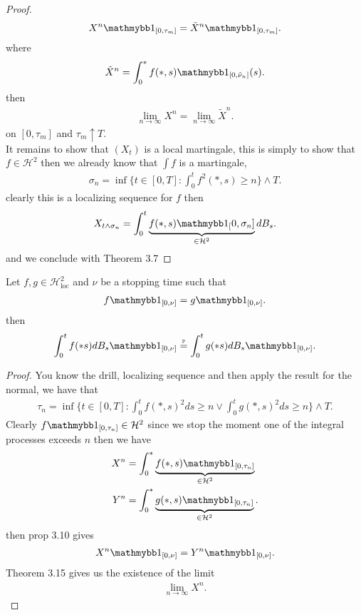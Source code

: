 \begin{proof}
\begin{align*}
    X^n \cha_{[0,\tau_m]} =   \tilde{X}^n \cha_{[0,\tau_m ]}
  .\end{align*}
  where 
  \begin{align*}
    \tilde{X}^n = \int_0^{*}  f(*,s)\cha_{[0,\tilde{\nu }_n ]}(s)
  .\end{align*}
then
\begin{align*}
  \lim_{n\to \infty}X^{n}  = \lim_{n\to \infty}\tilde{X}^{n}  
.\end{align*}
on $[0,\tau_m]$ and $\tau_m \uparrow T$.\\[1ex]
It remains to show that $(X_t)$ is a local martingale, 
this is simply to show that $f \in \mathcal{H}^2$ then we already know that $\int  f$ is a martingale,
\begin{align*}
  \sigma_n = \inf \{t \in [0,T]  : \int_0^{t} f^2(*,s) \ge n \}   \land T
.\end{align*}
clearly this is a localizing sequence for $f$ then 
\begin{align*}
  X_{t \land \sigma_n} = \int_{0}^{t} \underbrace{f(*,s)\cha_[0,\sigma_n]}_{\in  \mathcal{H}^2} dB_s
.\end{align*}
and we conclude with Theorem 3.7
\end{proof}
\begin{Theorem}[3.17]
  Let $f,g \in  \mathcal{H}^2_{\text{loc}}$   and $\nu $ be a stopping time such that 
  \begin{align*}
    f\cha_{[0,\nu ]} = g \cha_{[0,\nu ]}
  .\end{align*}
  then 
  \begin{align*}
    \int_0^{t} f(*s)dB_s \cha_{[0,\nu ]}  \myS{\P}{=} \int_0^{t} g(*s)dB_s \cha_{[0,\nu ]}  
  .\end{align*}
\end{Theorem}
\begin{proof}
 You know the drill, localizing sequence and then apply the result for the normal, we have that 
 \begin{align*}
   \tau_n  = \inf \{t \in  [0,T] : \int_0^{t} f(*,s)^2 ds \ge  n \lor \int_0^{t} g(*,s)^2 ds \ge n   \}  \land T
 .\end{align*}
 Clearly $f\cha_{[0,\tau_n]} \in  \mathcal{H}^2$ since we stop the moment one of the integral processes exceeds $n$ then we have 
 \begin{align*}
   X^{n}  &= \int_0^{*}  \underbrace{f(*,s)\cha_{[0,\tau_n]}}_{\in  \mathcal{H}^2} \\
   Y^{n}  &= \int_0^{*}  \underbrace{g(*,s)\cha_{[0,\tau_n]}}_{\in  \mathcal{H}^2} 
 .\end{align*}
 then prop 3.10 gives 
 \begin{align*}
   X^{n}\cha_{[0,\nu ]} = Y^{n} \cha_{[0,\nu ]}
 .\end{align*}
 Theorem 3.15 gives us the existence of the limit 
 \begin{align*}
   \lim_{n\to \infty}X^{n} 
 .\end{align*}
\end{proof}
